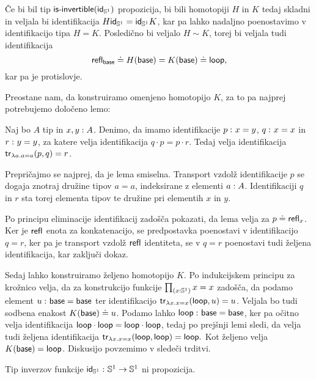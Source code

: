 Če bi bil tip \(\textnormal{\textsf{is-invertible}}(\textnormal{\textsf{id}}_{\mathbb{S}^{1}})\) propozicija, bi bili homotopiji \(H\) in \(K\) tedaj skladni in veljala bi identifikacija \(H\textnormal{\textsf{id}}_{\mathbb{S}^{1}} = \textnormal{\textsf{id}}_{\mathbb{S}^{1}}K\), kar pa lahko nadaljno poenostavimo v identifikacijo tipa \(H = K\). Posledično bi veljalo \(H \sim K\), torej bi veljala tudi identifikacija
\[\textnormal{\textsf{refl}}_{\textnormal{\textsf{base}}} \doteq H(\textnormal{\textsf{base}}) = K(\textnormal{\textsf{base}}) \doteq \textnormal{\textsf{loop}},\]
kar pa je protislovje.

Preostane nam, da konstruiramo omenjeno homotopijo \(K\), za to pa najprej potrebujemo določeno lemo:

\begin{lema}
  \label{transp-lemma}
  Naj bo \(A\) tip in \(x, y : A\). Denimo, da imamo identifikacije \(p \,\colon x = y\), \(q \,\colon x = x\) in \(r \,\colon y = y\), za katere velja identifikacija  \(q \cdot p = p \cdot r\). Tedaj velja identifikacija \(\textnormal{\textsf{tr}}_{\lambda a. a = a}(p, q) = r\).
\end{lema}

\begin{dokaz}
  Prepričajmo se najprej, da je lema smiselna. Transport vzdolž identifikacije \(p\) se dogaja znotraj družine tipov \(a = a\), indeksirane z elementi \(a : A\). Identifikaciji \(q\) in \(r\) sta torej elementa tipov te družine pri elementih \(x\) in \(y\).

  Po principu eliminacije identifikacij zadošča pokazati, da lema velja za \(p \doteq \textnormal{\textsf{refl}}_{x}\). Ker je \(\textnormal{\textsf{refl}}_{}\) enota za konkatenacijo, se predpostavka poenostavi v identifikacijo \(q = r\), ker pa je transport vzdolž \(\textnormal{\textsf{refl}}_{}\) identiteta, se v \(q = r\) poenostavi tudi željena identifikacija, kar zaključi dokaz.
\end{dokaz}

Sedaj lahko konstruiramo željeno homotopijo \(K\). Po indukcijskem principu za krožnico velja, da za konstrukcijo funkcije \(\textstyle \prod_{\left( x : \mathbb{S}^{1} \right)} x = x\) zadošča, da podamo element \(u \,\colon \textnormal{\textsf{base}} = \textnormal{\textsf{base}}\) ter identifikacijo \(\textnormal{\textsf{tr}}_{\lambda x. x = x}(\textnormal{\textsf{loop}}, u) = u\). Veljala bo tudi sodbena enakost \(K(\textnormal{\textsf{base}}) \doteq u\).
Podamo lahko \(\textnormal{\textsf{loop}} \,\colon \textnormal{\textsf{base}} = \textnormal{\textsf{base}}\), ker pa očitno velja identifikacija \(\textnormal{\textsf{loop}} \cdot \textnormal{\textsf{loop}} = \textnormal{\textsf{loop}} \cdot \textnormal{\textsf{loop}}\), tedaj po prejšnji lemi sledi, da velja tudi željena identifikacija \(\textnormal{\textsf{tr}}_{\lambda x. x = x}(\textnormal{\textsf{loop}}, \textnormal{\textsf{loop}}) = \textnormal{\textsf{loop}}.\)
Kot željeno velja \(K(\textnormal{\textsf{base}}) = \textnormal{\textsf{loop}}\). Diskusijo povzemimo v sledeči trditvi.

\begin{trditev}
  \label{inv-circle-neg-prop}
  Tip inverzov funkcije \(\textnormal{\textsf{id}}_{\mathbb{S}^{1}} \,\colon \mathbb{S}^{1} \to \mathbb{S}^{1}\) ni propozicija.
\end{trditev}

